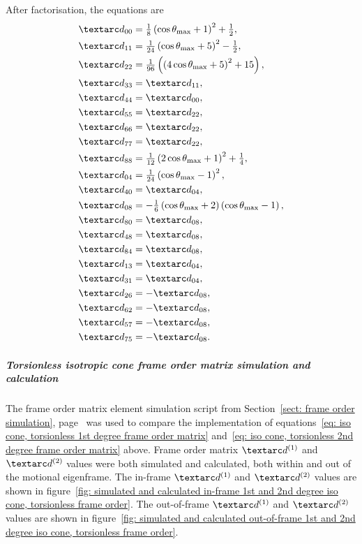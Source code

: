 After factorisation, the equations are
\begin{subequations} \label{eq: iso cone, torsionless 2nd degree frame order matrix}
\begin{align}
    &\FO_{00} = \tfrac{1}{8} \left( \cos\conethetamax + 1 \right)^2 + \half, \\
    &\FO_{11} = \tfrac{1}{24} \left( \cos\conethetamax + 5 \right)^2 - \half, \\
    &\FO_{22} = \tfrac{1}{96} \left( \left( 4\cos\conethetamax + 5 \right)^2 + 15 \right) , \\
    &\FO_{33} = \FO_{11} , \\
    &\FO_{44} = \FO_{00} , \\
    &\FO_{55} = \FO_{22} , \\
    &\FO_{66} = \FO_{22} , \\
    &\FO_{77} = \FO_{22} , \\
    &\FO_{88} = \tfrac{1}{12} \left( 2\cos\conethetamax + 1 \right)^2 + \quart, \\
    &\FO_{04} = \tfrac{1}{24} \left( \cos\conethetamax - 1 \right)^2 , \\
    &\FO_{40} = \FO_{04} , \\
    &\FO_{08} = -\tfrac{1}{6} \left( \cos\conethetamax + 2 \right) \left( \cos\conethetamax - 1 \right) , \\
    &\FO_{80} = \FO_{08} , \\
    &\FO_{48} = \FO_{08} , \\
    &\FO_{84} = \FO_{08} , \\
    &\FO_{13} = \FO_{04} , \\
    &\FO_{31} = \FO_{04} , \\
    &\FO_{26} = -\FO_{08} , \\
    &\FO_{62} = -\FO_{08} , \\
    &\FO_{57} = -\FO_{08} , \\
    &\FO_{75} = -\FO_{08} .
\end{align}
\end{subequations}

\subparagraph[Frame order matrix simulation and calculation]{Torsionless isotropic cone frame order matrix simulation and calculation}

The frame order matrix element simulation script from Section~\ref{sect: frame order simulation}, page~\pageref{sect: frame order simulation} was used to compare the implementation of equations~\ref{eq: iso cone, torsionless 1st degree frame order matrix} and~\ref{eq: iso cone, torsionless 2nd degree frame order matrix} above.
Frame order matrix $\FOone$ and $\FOtwo$ values were both simulated and calculated, both within and out of the motional eigenframe.
The in-frame $\FOone$ and $\FOtwo$ values are shown in figure~\ref{fig: simulated and calculated in-frame 1st and 2nd degree iso cone, torsionless frame order}.
The out-of-frame $\FOone$ and $\FOtwo$ values are shown in figure~\ref{fig: simulated and calculated out-of-frame 1st and 2nd degree iso cone, torsionless frame order}.



